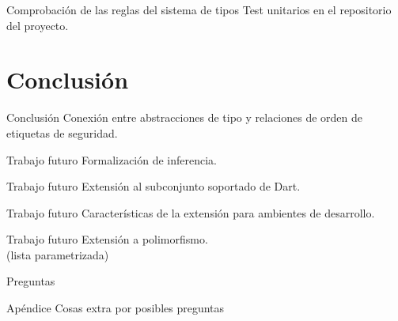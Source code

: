 \documentclass[aspectratio=169,10pt]{beamer}
\begin{document}
\begin{frame}[fragile]{Comprobación de las reglas del sistema de tipos}
	Test unitarios en el repositorio del proyecto.
\end{frame}

\section{Conclusión}

\begin{frame}[fragile]{Conclusión}
	Conexión entre abstracciones de tipo y relaciones de orden de etiquetas de seguridad.
\end{frame}

\begin{frame}[fragile]{Trabajo futuro}
	Formalización de inferencia.
\end{frame}

\begin{frame}[fragile]{Trabajo futuro}
	Extensión al subconjunto soportado de Dart.
\end{frame}

\begin{frame}[fragile]{Trabajo futuro}
	Características de la extensión para ambientes de desarrollo.
\end{frame}

\begin{frame}[fragile]{Trabajo futuro}
	Extensión a polimorfismo. \\ \pause
	(lista parametrizada)
\end{frame}


{
\begin{frame}[standout]
  Preguntas
\end{frame}
}

\appendix

\begin{frame}[fragile]{Apéndice}
  Cosas extra por posibles preguntas
\end{frame}
\end{document}
